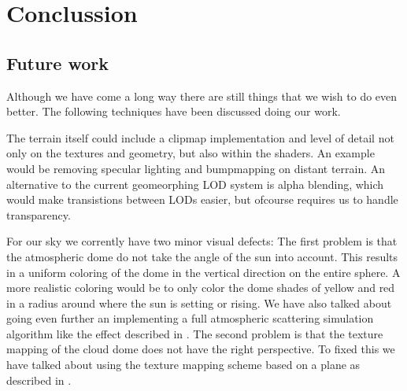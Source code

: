 
\chapter{Conclussion}








\section{Future work}
Although we have come a long way there are still things that we wish to
do even better. The following techniques have been discussed doing our
work.

The terrain itself could include a clipmap implementation and level of
detail not only on the textures and geometry, but also within the
shaders. An example would be removing specular lighting and
bumpmapping on distant terrain. An alternative to the current
geomeorphing LOD system is alpha blending, which would make
transistions between LODs easier, but ofcourse requires us to handle
transparency.

For our sky we corrently have two minor visual defects: The first
problem is that the atmospheric dome do not take the angle of the sun
into account. This results in a uniform coloring of the dome in the
vertical direction on the entire sphere. A more realistic coloring
would be to only color the dome shades of yellow and red in a radius
around where the sun is setting or rising.
%
We have also talked about going even further an implementing a full
atmospheric scattering simulation algorithm like the
effect described in .
%
The second problem is that the texture mapping of the cloud dome does
not have the right perspective.
To fixed this we have talked about using the texture mapping scheme
based on a plane as described in .

